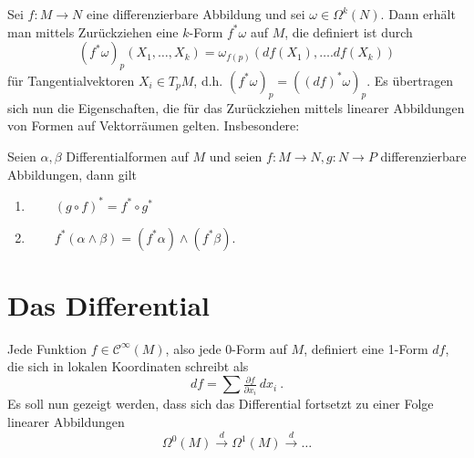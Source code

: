 \documentclass[%
	paper=a5,%
	fleqn,%
	DIV=18,%
	BCOR=0mm,
	fontsize=11pt,
	titlepage=false,%
	bibliography=totoc,
	DIV=18,%
	twoside=true,
	pdftitle=Riemannsche Geometrie,
	pdfauthor=Uwe Semmelmann,
	numbers=noendperiod]%
	{scrbook}
\begin{document}
Sei $f: M \rightarrow N$ eine differenzierbare  Abbildung und sei $\omega \in \Omega^k(N)$. Dann erh\"alt man
mittels Zur\"uckziehen eine $k$-Form $f^*\omega$ auf $M$, die definiert ist durch
$$
(f^*\omega)_p (X_1, \ldots , X_k)
=
\omega_{f(p)} (df (X_1), \ldots . df(X_k))
$$
f\"ur Tangentialvektoren $X_i \in T_pM$, d.h. $(f^*\omega)_p =
((df)^*\omega)_p$. Es \"ubertragen sich nun die Eigenschaften, die f\"ur das Zur\"uckziehen mittels linearer Abbildungen von Formen auf Vektorr\"aumen gelten. Insbesondere:

\begin{Lemma}
Seien $\alpha, \beta$ Differentialformen auf $M$ und seien $f:M\rightarrow N, g: N \rightarrow P$ differenzierbare
Abbildungen, dann gilt
\begin{enumerate}
\item
$ \qquad (g \circ f)^* = f^* \circ g^*$
\item
$ \qquad f^*(\alpha \wedge \beta) = (f^*\alpha) \wedge (f^*\beta) $.\fish
\end{enumerate}
\end{Lemma}


\bigskip

\section{Das Differential}

Jede Funktion $f \in \mathcal C^\infty(M)$, also jede 0-Form auf $M$, definiert eine 1-Form $df$,
die sich in lokalen  Koordinaten schreibt als
$$
df = \sum \tfrac{\partial f}{\partial x_i}\, dx_i \ .
$$
Es soll nun gezeigt werden, dass sich das Differential fortsetzt zu einer Folge linearer
Abbildungen
$$
\Omega^0(M)   \stackrel{d}{\rightarrow}  \Omega^1(M)    \stackrel{d}{\rightarrow} \ldots
$$


\bigskip
\end{document}
